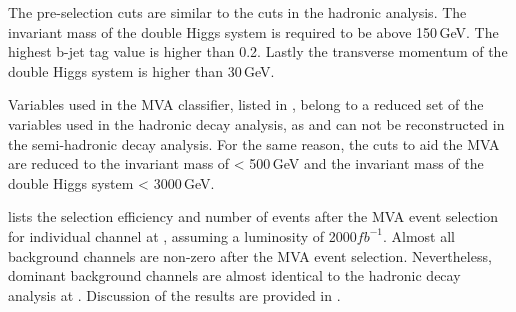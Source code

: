 The pre-selection cuts are similar to the cuts in the hadronic analysis. The invariant mass of the double Higgs system is required to be above 150\,GeV. The highest b-jet tag value is higher than 0.2. Lastly the transverse momentum of the double Higgs system is higher than 30\,GeV.

Variables used in the MVA classifier, listed in  ,  belong to  a reduced set of the variables  used in the hadronic decay analysis, as \Hbb and \PW can not be reconstructed in the semi-hadronic decay analysis. For the same reason, the cuts to aid the MVA are reduced to the invariant mass of \Hbb < 500\,GeV and the invariant mass of the double Higgs system < 3000\,GeV.



 lists the  selection efficiency and number of events after the MVA event selection for individual channel at , assuming a luminosity of 2000$fb^{-1}$.  Almost all background channels are non-zero after the MVA event selection. Nevertheless,  dominant background channels are almost identical to the hadronic decay analysis  at . Discussion of the results are provided in .

